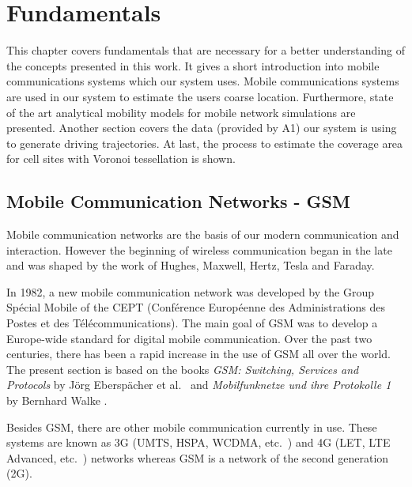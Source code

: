 \documentclass[master,english]{hgbthesis}
\begin{document}

\chapter{Fundamentals}

\label{cha:fundamentals}

This chapter covers fundamentals that are necessary for a better understanding of the concepts presented in this work. It gives a short introduction into mobile communications systems which our system uses. Mobile communications systems are used in our system to estimate the users coarse location. Furthermore, state of the art analytical mobility models for mobile network simulations are presented. Another section covers the data (provided by A1) our system is using to generate driving trajectories. At last, the process to estimate the coverage area for cell sites with Voronoi tessellation is shown.

\section{Mobile Communication Networks - GSM}


Mobile communication networks are the basis of our modern communication and interaction. However the beginning of wireless communication began in the late  and was shaped by the work of Hughes, Maxwell, Hertz, Tesla and Faraday. 

In 1982, a new mobile communication network was developed by the Group Spécial Mobile of the CEPT (Conférence Européenne des Administrations des Postes et des Télécommunications). The main goal of GSM was to develop a Europe-wide standard for digital mobile communication. Over the past two centuries, there has been a rapid increase in the use of GSM all over the world. The present section is based on the books \emph{GSM: Switching, Services and Protocols} by Jörg Eberspächer et al.\ \cite{Eberspaecher2001} and \emph{Mobilfunknetze und ihre Protokolle 1} by Bernhard Walke \cite{Walke2001}. 

Besides GSM, there are other mobile communication currently in use. These systems are known as 3G (UMTS, HSPA, WCDMA, etc.\ ) and 4G (LET, LTE Advanced, etc.\ ) networks whereas GSM is a network of the second generation (2G).
\end{document}
